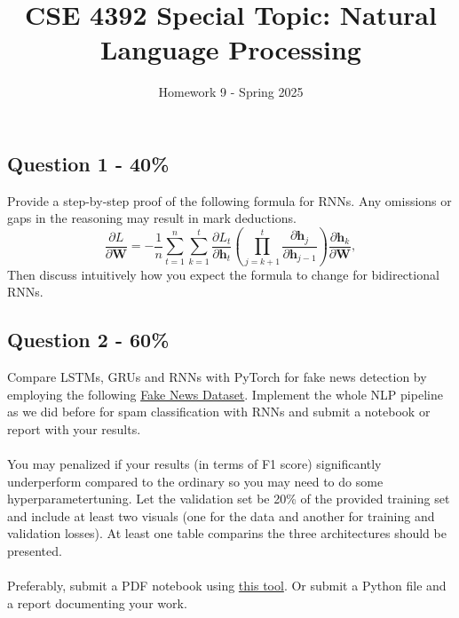 \documentclass{article}
\newcommand{\answerboxbig}{
    \vspace{20cm} %
}
\begin{document}
\title{CSE 4392 Special Topic: Natural Language Processing}
\author{Homework 9 - Spring 2025}
\maketitle
\thispagestyle{fancy}


\subsection*{Question 1 - 40\%}
Provide a step-by-step proof of the following formula for RNNs. Any omissions or gaps in the reasoning may result in mark deductions.
$$\frac{\partial L }{\partial \mathbf{W}} = -\frac{1}{n}\sum_{t=1}^{n}\sum_{k=1}^{t}  \frac{\partial L_t }{\partial  \mathbf{h}_t}\left ( \prod_{j=k+1}^{t}  \frac{\partial \mathbf{h}_j  }{\partial  \mathbf{h}_{j-1}} \right ) \frac{\partial \mathbf{h}_k }{\partial \mathbf{W}},$$
Then discuss intuitively how you expect the formula to change for bidirectional RNNs. 
\answerboxbig

\subsection*{Question 2 - 60\%}
Compare LSTMs, GRUs and RNNs with PyTorch for fake news detection by employing the following \href{https://www.kaggle.com/c/fake-news/data}{Fake News Dataset}. Implement the whole NLP pipeline as we did before for spam classification with RNNs and submit a notebook or report with your results. 
\\
\\
You may penalized if your results (in terms of F1 score) significantly underperform compared to the ordinary so you may need to do some hyperparametertuning. Let the validation set be 20\% of the provided training set and include at least two visuals (one for the data and another for training and validation losses). At least one table comparins the three architectures should be presented.
\\
\\
Preferably, submit a PDF notebook using \hyperlink{https://htmtopdf.herokuapp.com/ipynbviewer/#google_vignette}{this tool}. Or submit a Python file and a report documenting your work.
\end{document}

